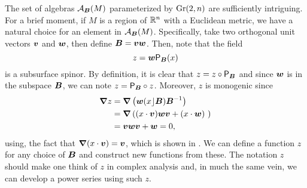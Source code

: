 The set of algebras $\mathcal{A}_{\boldsymbol{B}}(M)$ parameterized by $\operatorname{Gr}(2,n)$ are sufficiently intriguing. For a brief moment, if $M$ is a region of $\mathbb{R}^n$ with a Euclidean metric, we have a natural choice for an element in $\mathcal{A}_{\boldsymbol{B}}(M)$. Specifically, take two orthogonal unit vectors $\boldsymbol{v}$ and $\boldsymbol{w}$, then define $\boldsymbol{B} = \boldsymbol{v}\boldsymbol{w}$. Then, note that the field
\begin{equation}
\label{eq:z}
z = \boldsymbol{w} \mathsf{P}_{\boldsymbol{B}}(x)
\end{equation}
is a subsurface spinor. By definition, it is clear that $z = z \circ \mathsf{P}_{\boldsymbol{B}}$ and since $\boldsymbol{w}$ is in the subspace $\boldsymbol{B}$, we can note $z = \mathsf{P}_{\boldsymbol{B}} \circ z$. Moreover, $z$ is monogenic since
\begin{align}
\boldsymbol{\nabla} z &= \boldsymbol{\nabla}\left(\boldsymbol{w} (x\rfloor \boldsymbol{B})\boldsymbol{B}^{-1}\right)\\
    &= \boldsymbol{\nabla} \left( (x\cdot \boldsymbol{v})\boldsymbol{w}\boldsymbol{v}+(x\cdot \boldsymbol{w}) \ \right)\\
    &= \boldsymbol{v}\boldsymbol{w}\boldsymbol{v}+\boldsymbol{w} = 0,
\end{align}
using, the fact that $\boldsymbol{\nabla} (x \cdot \boldsymbol{v})=\boldsymbol{v}$, which is shown in \cite[eq. (6.5)]{doran_geometric_2003}. We can define a function $z$ for any choice of $\boldsymbol{B}$ and construct new functions from these. The notation $z$ should make one think of $z$ in complex analysis and, in much the same vein, we can develop a power series using such $z$.


